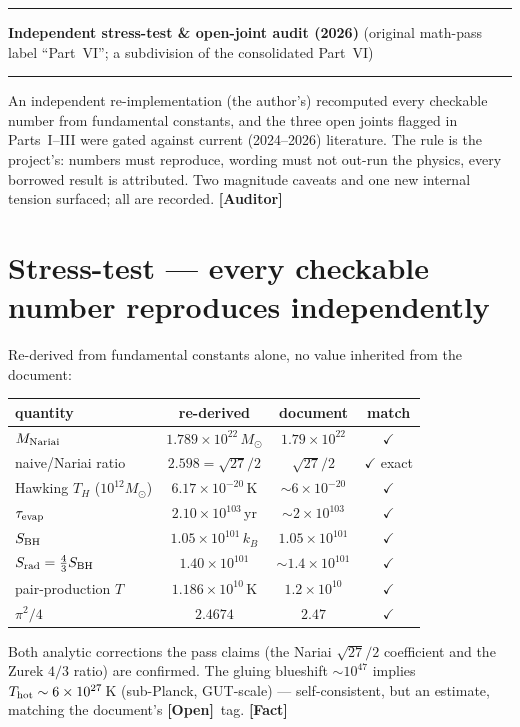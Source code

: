\documentclass[11pt]{article}
\newcommand{\Fact}{\textbf{\textcolor{green!45!black}{[Fact]}}}
\newcommand{\Open}{\textbf{\textcolor{gray!10!black}{[Open]}}}
\newcommand{\Auditor}{\textbf{\textcolor{teal!55!black}{[Auditor]}}}
\newcommand{\msun}{M_\odot}
\begin{document}
\vspace{10pt}\hrule\vspace{2pt}
\begin{center}{\LARGE\bfseries Independent stress-test \& open-joint audit (2026)} {\small (original math-pass label ``Part~VI''; a subdivision of the consolidated Part~VI)}\end{center}
\vspace{1pt}\hrule\vspace{5pt}
{\small An independent re-implementation (the author's) recomputed every checkable number from fundamental constants, and the three open joints flagged in Parts~I--III were gated against current (2024--2026) literature. The rule is the project's: numbers must reproduce, wording must not out-run the physics, every borrowed result is attributed. Two magnitude caveats and one new internal tension surfaced; all are recorded. \Auditor}

\section{Stress-test --- every checkable number reproduces independently}
Re-derived from fundamental constants alone, no value inherited from the document:
\begin{center}\small
\begin{tabular}{@{}lccc@{}}
\toprule
quantity & re-derived & document & match \\
\midrule
$M_{\rm Nariai}$ & $1.789\times10^{22}\,\msun$ & $1.79\times10^{22}$ & $\checkmark$ \\
naive/Nariai ratio & $2.598=\sqrt{27}/2$ & $\sqrt{27}/2$ & $\checkmark$ exact \\
Hawking $T_H$ ($10^{12}\msun$) & $6.17\times10^{-20}$\,K & $\sim6\times10^{-20}$ & $\checkmark$ \\
$\tau_{\rm evap}$ & $2.10\times10^{103}$\,yr & $\sim2\times10^{103}$ & $\checkmark$ \\
$S_{\rm BH}$ & $1.05\times10^{101}\,k_B$ & $1.05\times10^{101}$ & $\checkmark$ \\
$S_{\rm rad}=\tfrac43 S_{\rm BH}$ & $1.40\times10^{101}$ & $\sim1.4\times10^{101}$ & $\checkmark$ \\
pair-production $T$ & $1.186\times10^{10}$\,K & $1.2\times10^{10}$ & $\checkmark$ \\
$\pi^2/4$ & $2.4674$ & $2.47$ & $\checkmark$ \\
\bottomrule
\end{tabular}
\end{center}
Both analytic corrections the pass claims (the Nariai $\sqrt{27}/2$ coefficient and the Zurek $4/3$ ratio) are confirmed. The gluing blueshift $\sim10^{47}$ implies $T_{\rm hot}\sim6\times10^{27}$\,K (sub-Planck, GUT-scale) --- self-consistent, but an estimate, matching the document's \Open\ tag. \Fact
\end{document}
